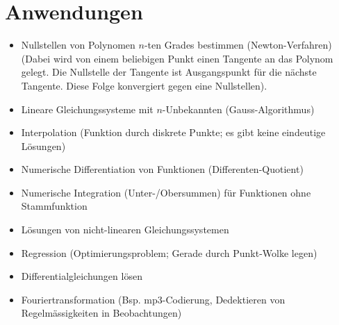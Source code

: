 \section{Anwendungen}
\begin{itemize}
  \item Nullstellen von Polynomen $n$-ten Grades bestimmen (Newton-Verfahren) 
  (Dabei wird von einem beliebigen Punkt einen Tangente an das Polynom gelegt. Die Nullstelle der Tangente ist Ausgangspunkt für die nächste Tangente. Diese Folge konvergiert gegen eine Nullstellen).
  \item Lineare Gleichungssysteme mit $n$-Unbekannten (Gauss-Algorithmus)
  \item Interpolation (Funktion durch diskrete Punkte; es gibt keine eindeutige Lösungen)
  \item Numerische Differentiation von Funktionen (Differenten-Quotient)
  \item Numerische Integration (Unter-/Obersummen) für Funktionen ohne Stammfunktion 
  \item Lösungen von nicht-linearen Gleichungssystemen
  \item Regression (Optimierungsproblem; Gerade durch Punkt-Wolke legen)
  \item Differentialgleichungen lösen
  \item Fouriertransformation (Bsp. mp3-Codierung, Dedektieren von Regelmässigkeiten in Beobachtungen)
\end{itemize}
